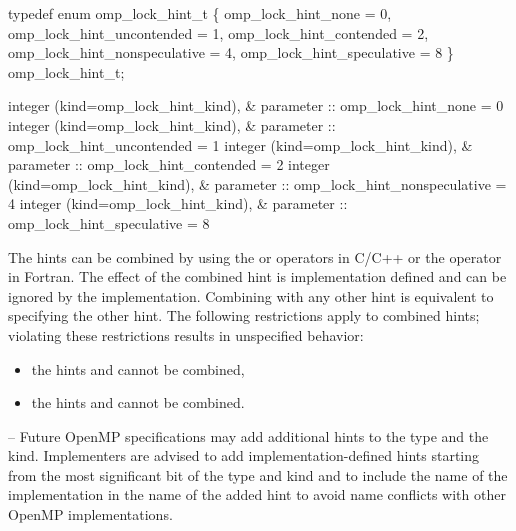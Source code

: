 \ccppspecificstart
\begin{codepar}
typedef enum omp\_lock\_hint\_t \{
  omp\_lock\_hint\_none = 0,
  omp\_lock\_hint\_uncontended = 1,
  omp\_lock\_hint\_contended = 2,
  omp\_lock\_hint\_nonspeculative = 4,
  omp\_lock\_hint\_speculative = 8
\} omp\_lock\_hint\_t;
\end{codepar}
\ccppspecificend

\newpage %

\fortranspecificstart
\begin{codepar}
integer (kind=omp\_lock\_hint\_kind), &
        parameter :: omp\_lock\_hint\_none = 0
integer (kind=omp\_lock\_hint\_kind), &
        parameter :: omp\_lock\_hint\_uncontended = 1
integer (kind=omp\_lock\_hint\_kind), &
        parameter :: omp\_lock\_hint\_contended = 2
integer (kind=omp\_lock\_hint\_kind), &
        parameter :: omp\_lock\_hint\_nonspeculative = 4 
integer (kind=omp\_lock\_hint\_kind), &
        parameter :: omp\_lock\_hint\_speculative = 8
\end{codepar}
\fortranspecificend

The hints can be combined by using the \code{+} or \code{|} operators in C/C++ or the \code{+} operator in Fortran.  
The effect of the combined hint is implementation defined and can be ignored by the implementation.
Combining  with any other hint is equivalent to specifying the other hint.
The following restrictions apply to combined hints; violating these 
restrictions results in unspecified behavior:
\begin{itemize}
\item the hints  and  cannot be combined,
\item the hints  and  cannot be combined.
\end{itemize}


\notestart
\noteheader -- Future OpenMP specifications may add additional hints to the 
 type and the  kind.  
Implementers are advised to add implementation-defined hints starting from 
the most significant bit of the  type and
 kind and to include the name of the 
implementation in the name of the added hint to avoid name conflicts 
with other OpenMP implementations.
\noteend


